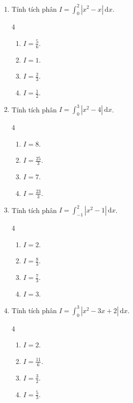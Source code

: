 \documentclass[12pt]{article}
\begin{document}
\begin{enumerate}[label=\textbf{Câu \arabic*.}]
		\item Tính tích phân $I = \displaystyle \int_{0}^{2} |x^2 - x|\,\mathrm{d}x$.
		\begin{multicols}{4}
			\begin{enumerate}[label=\textbf{\Alph*.}]
				\item $I = \frac{5}{6}$.
				\item $I = 1$.
				\item $I = \frac{2}{3}$.
				\item $I = \frac{1}{2}$.
			\end{enumerate}
		\end{multicols}
		
		\item Tính tích phân $I = \displaystyle \int_{0}^{3} |x^2 - 4|\,\mathrm{d}x$.
		\begin{multicols}{4}
			\begin{enumerate}[label=\textbf{\Alph*.}]
				\item $I = 8$.
				\item $I = \frac{25}{3}$.
				\item $I = 7$.
				\item $I = \frac{23}{3}$.
			\end{enumerate}
		\end{multicols}
		
		\item Tính tích phân $I = \displaystyle \int_{-1}^{2} |x^2 - 1|\,\mathrm{d}x$.
		\begin{multicols}{4}
			\begin{enumerate}[label=\textbf{\Alph*.}]
				\item $I = 2$.
				\item $I = \frac{8}{3}$.
				\item $I = \frac{7}{3}$.
				\item $I = 3$.
			\end{enumerate}
		\end{multicols}
		
		\item Tính tích phân $I = \displaystyle \int_{0}^{3} |x^2 - 3x + 2|\,\mathrm{d}x$.
		\begin{multicols}{4}
			\begin{enumerate}[label=\textbf{\Alph*.}]
				\item $I = 2$.
				\item $I = \frac{11}{6}$.
				\item $I = \frac{3}{2}$.
				\item $I = \frac{5}{3}$.
			\end{enumerate}
		\end{multicols}
		

\end{enumerate}
\end{document}
